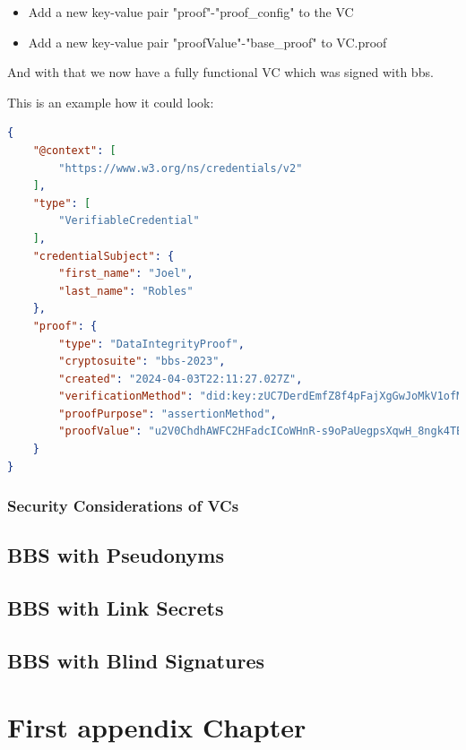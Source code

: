 \documentclass[
	a4paper               %
	,bibliography=totoc   %
	,listof=totoc         %
	,monolingual
	twoside=false,
]{bfhthesis}              %
\begin{document}
\begin{itemize}
	\item Add a new key-value pair "proof"-"proof\_config" to the VC
	\item Add a new key-value pair "proofValue"-"base\_proof" to VC.proof 
\end{itemize}

And with that we now have a fully functional VC which was signed with bbs.

This is an example how it could look:

\begin{lstlisting}[language=json,firstnumber=1,caption={Signed VC},captionpos=b]
{
	"@context": [
		"https://www.w3.org/ns/credentials/v2"
	],
	"type": [
		"VerifiableCredential"
	],
	"credentialSubject": {
		"first_name": "Joel",
		"last_name": "Robles"
	},
	"proof": {
		"type": "DataIntegrityProof",
		"cryptosuite": "bbs-2023",
		"created": "2024-04-03T22:11:27.027Z",
		"verificationMethod": "did:key:zUC7DerdEmfZ8f4pFajXgGwJoMkV1ofMTmEG5UoNvnWiPiLuGKNeqgRpLH2TV4Xe5mJ2cXV76gRN7LFQwapF1VFu6x2yrr5ci1mXqC1WNUrnHnLgvfZfMH7h6xP6qsf9EKRQrPQ#zUC7DerdEmfZ8f4pFajXgGwJoMkV1ofMTmEG5UoNvnWiPiLuGKNeqgRpLH2TV4Xe5mJ2cXV76gRN7LFQwapF1VFu6x2yrr5ci1mXqC1WNUrnHnLgvfZfMH7h6xP6qsf9EKRQrPQ",
		"proofPurpose": "assertionMethod",
		"proofValue": "u2V0ChdhAWFC2HFadcICoWHnR-s9oPaUegpsXqwH_8ngk4TBuMLDFqnvVCo9axh2gcmb2w4KJ5LlfQOgl6M_YY3waJwFPMF5oqtZGI0rzf6HfWOS6VfGPWthAWEClRFA4ut1V3aj4gUvaZAvy2PvZHn-CFZzt5TUfXODzG0MDCe45ZPrMkpKH4UaaxIUqC6L_lhaGZLEMu5ae3gHb2EBYYKTvGvo9pXVJbxIrm3i4wkdhUxqKCTIGrnxFuAdZwWi6T3omD5wzZ7bAGbRneEEQSxBmXtvnC6Pr59nPv_v3HrAW9wq_uxYzF_NyaX3GPv0h_FV2T2OSao8C6uoyWiqIj9hAWCAAESIzRFVmd4iZqrvM3e7_ABEiM0RVZneImaq7zN3u_4F4HS9jcmVkZW50aWFsU3ViamVjdC9maXJzdF9uYW1l"
	}
}
\end{lstlisting}

\subsection{Security Considerations of VCs}
\label{subsec:vcseccons}


\section{BBS with Pseudonyms}
\label{chap:Pseudonyms}

\section{BBS with Link Secrets}
\label{chap:linksecrets}

\section{BBS with Blind Signatures}
\label{chap:blindsignatures}




\appendix

\chapter{First appendix Chapter}





\end{document}
